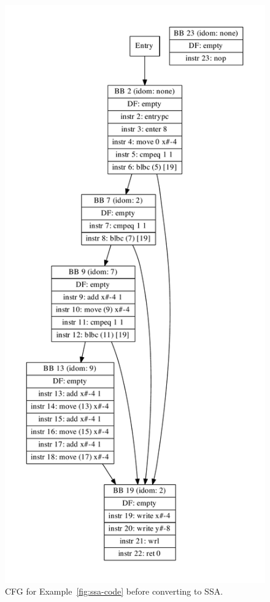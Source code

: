 \documentclass[10pt,twocolumn]{article}
\begin{document}
\begin{figure}
\begin{center}
  \includegraphics[width=0.95\columnwidth]{figs/simple6-pressa.pdf}
\begin{minipage}{0.95\columnwidth}
  \caption{\label{fig:pressa} CFG for Example~\ref{fig:ssa-code} before converting to SSA.}
\end{minipage}
\end{center}
\end{figure}
\end{document}
